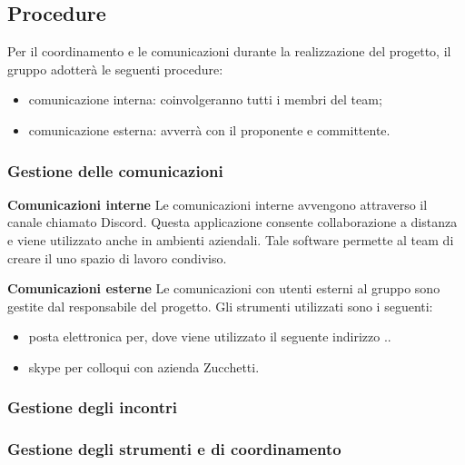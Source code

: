 \subsection{Procedure}
Per il coordinamento e le comunicazioni durante la realizzazione del progetto, il gruppo adotterà le seguenti procedure: 
\begin{itemize}
\item{comunicazione interna}: coinvolgeranno tutti i membri del team;
\item{comunicazione esterna}: avverrà con il proponente e committente.
\end{itemize}

\subsubsection{Gestione delle comunicazioni}
\textbf{Comunicazioni interne} \newline \newline
Le comunicazioni interne avvengono attraverso il canale chiamato Discord. Questa applicazione consente collaborazione a distanza e viene utilizzato anche in ambienti aziendali. Tale software permette al team di creare il uno spazio di lavoro condiviso.

\textbf{Comunicazioni esterne} \newline \newline
Le comunicazioni con utenti esterni al gruppo sono gestite dal responsabile del progetto. Gli strumenti utilizzati sono i seguenti: 
\begin{itemize}
\item posta elettronica per, dove viene utilizzato il seguente indirizzo ..
\item skype per colloqui con azienda Zucchetti.
\end{itemize}

\subsubsection{Gestione degli incontri}


\subsubsection{Gestione degli strumenti e di coordinamento}
